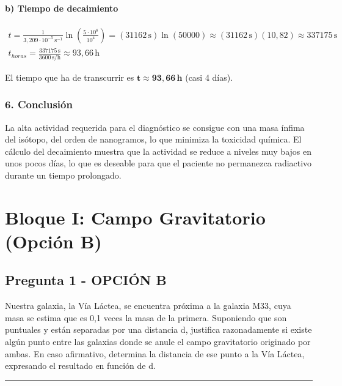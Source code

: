 \paragraph{b) Tiempo de decaimiento}
\begin{gather}
    t = \frac{1}{3,209 \cdot 10^{-5}\,\text{s}^{-1}} \ln\left(\frac{5 \cdot 10^8}{10^4}\right) = (31162\,\text{s}) \ln(50000) \approx (31162\,\text{s})(10,82) \approx 337175\,\text{s} \\
    t_{horas} = \frac{337175\,\text{s}}{3600\,\text{s/h}} \approx 93,66\,\text{h}
\end{gather}
\begin{cajaresultado}
    El tiempo que ha de transcurrir es $\boldsymbol{t \approx 93,66\,\textbf{h}}$ (casi 4 días).
\end{cajaresultado}

\subsubsection*{6. Conclusión}
\begin{cajaconclusion}
La alta actividad requerida para el diagnóstico se consigue con una masa ínfima del isótopo, del orden de nanogramos, lo que minimiza la toxicidad química. El cálculo del decaimiento muestra que la actividad se reduce a niveles muy bajos en unos pocos días, lo que es deseable para que el paciente no permanezca radiactivo durante un tiempo prolongado.
\end{cajaconclusion}

\newpage


\section{Bloque I: Campo Gravitatorio (Opción B)}
\label{sec:grav_B_2015_jun_ord}

\subsection{Pregunta 1 - OPCIÓN B}
\label{subsec:1B_2015_jun_ord}

\begin{cajaenunciado}
Nuestra galaxia, la Vía Láctea, se encuentra próxima a la galaxia M33, cuya masa se estima que es 0,1 veces la masa de la primera. Suponiendo que son puntuales y están separadas por una distancia d, justifica razonadamente si existe algún punto entre las galaxias donde se anule el campo gravitatorio originado por ambas. En caso afirmativo, determina la distancia de ese punto a la Vía Láctea, expresando el resultado en función de d.
\end{cajaenunciado}
\hrule

